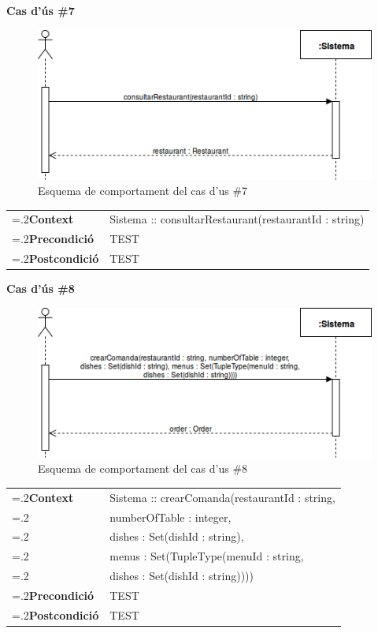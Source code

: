 \clearpage
\noindent\textbf{\large Cas d'ús \#7}\\
\begin{figure}[H]
\centering
\includegraphics[scale=0.6]{Figures/casdus_07.png}
\caption{Esquema de comportament del cas d'us \#7}
\end{figure}
\begin{table}[h]
\noindent
\begin{tabularx}{\linewidth}{
>{\hsize=.2\hsize}X%
>{\hsize=0.8\hsize}X%
}
\textbf{Context} 		& Sistema :: consultarRestaurant(restaurantId : string) \\
\textbf{Precondició} 	& TEST \\
\textbf{Postcondició}	& TEST \\
\end{tabularx}
\label{}
\end{table}

\noindent\textbf{\large Cas d'ús \#8}\\
\begin{figure}[H]
\centering
\includegraphics[scale=0.6]{Figures/casdus_08.png}
\caption{Esquema de comportament del cas d'us \#8}
\end{figure}
\begin{table}[h]
\noindent
\begin{tabularx}{\linewidth}{
>{\hsize=.2\hsize}X%
>{\hsize=0.8\hsize}X%
}
\textbf{Context} 		& Sistema :: crearComanda(restaurantId : string, \\
						& numberOfTable : integer, \\
						& dishes : Set(dishId : string), \\
						& menus : Set(TupleType(menuId : string, \\
						& dishes : Set(dishId : string)))) \\
\textbf{Precondició} 	& TEST \\
\textbf{Postcondició}	& TEST \\
\end{tabularx}
\label{}
\end{table}

